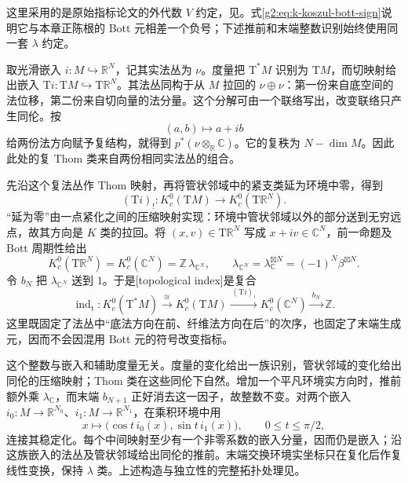 这里采用的是原始指标论文的外代数 \(V\) 约定，见\cite[第2节，第493--494页]{AtiyahSinger1968I}。式\eqref{g2:eq:k-koszul-bott-sign}说明它与本章正陈根的 Bott 元相差一个负号；下述推前和末端整数识别始终使用同一套 \(\lambda\) 约定。

\ProseParagraphBreak

取光滑嵌入 \(i:M\hookrightarrow\mathbb R^N\)，记其实法丛为 \(\nu\)。度量把 \(\mathrm T^*M\) 识别为 \(\mathrm TM\)，而切映射给出嵌入 \(\mathrm Ti:\mathrm TM\hookrightarrow\mathrm T\mathbb R^N\)。其法丛同构于从 \(M\) 拉回的 \(\nu\oplus\nu\)：第一份来自底空间的法位移，第二份来自切向量的法分量。这个分解可由一个联络写出，改变联络只产生同伦。按
\[
	(a,b)\longmapsto a+ib
\]
给两份法方向赋予复结构，就得到 \(p^*(\nu\otimes_{\mathbb R}\mathbb C)\)。它的复秩为 \(N-\dim M\)。因此此处的复 Thom 类来自两份相同实法丛的组合。

\ProseParagraphBreak

先沿这个复法丛作 Thom 映射，再将管状邻域中的紧支类延为环境中零，得到
\[
	(\mathrm Ti)_!:K_c^0(\mathrm TM)\longrightarrow
	K_c^0(\mathrm T\mathbb R^N).
\]
“延为零”由一点紧化之间的压缩映射实现：环境中管状邻域以外的部分送到无穷远点，故其方向是 \(K\) 类的拉回。将 \((x,v)\in\mathrm T\mathbb R^N\) 写成 \(x+iv\in\mathbb C^N\)，前一命题及 Bott 周期性给出
\[
	K_c^0(\mathrm T\mathbb R^N)=K_c^0(\mathbb C^N)
	=\mathbb Z\,\lambda_{\mathbb C^N},\qquad
	\lambda_{\mathbb C^N}=\lambda_{\mathbb C}^{\boxtimes N}=(-1)^N\beta^{\boxtimes N}.
\]
令 \(b_N\) 把 \(\lambda_{\mathbb C^N}\) 送到 \(1\)。于是[topological index]是复合
\begin{equation}\label{g2:eq:topological-index-pushforward}
	\operatorname{ind}_{\mathrm t}:K_c^0(\mathrm T^*M)
	\xrightarrow{\ \cong\ }K_c^0(\mathrm TM)
	\xrightarrow{\ (\mathrm Ti)_!\ }K_c^0(\mathbb C^N)
	\xrightarrow{\ b_N\ }\mathbb Z.
\end{equation}
这里既固定了法丛中“底法方向在前、纤维法方向在后”的次序，也固定了末端生成元，因而不会因混用 Bott 元的符号改变指标。

\ProseParagraphBreak

这个整数与嵌入和辅助度量无关。度量的变化给出一族识别，管状邻域的变化给出同伦的压缩映射；Thom 类在这些同伦下自然。增加一个平凡环境实方向时，推前额外乘 \(\lambda_{\mathbb C}\)，而末端 \(b_{N+1}\) 正好消去这一因子，故整数不变。对两个嵌入 \(i_0:M\to\mathbb R^{N_0}\)、\(i_1:M\to\mathbb R^{N_1}\)，在乘积环境中用
\[
	x\longmapsto\bigl(\cos t\,i_0(x),\sin t\,i_1(x)\bigr),
	\qquad 0\le t\le\pi/2,
\]
连接其稳定化。每个中间映射至少有一个非零系数的嵌入分量，因而仍是嵌入；沿这族嵌入的法丛及管状邻域给出同伦的推前。末端交换环境实坐标只在复化后作复线性变换，保持 \(\lambda\) 类。上述构造与独立性的完整拓扑处理见\cite[第3节，第497--499页]{AtiyahSinger1968I}。

